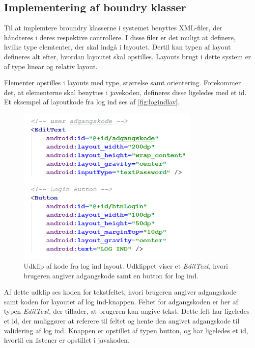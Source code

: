 \subsection{Implementering af boundry klasser}
Til at implemtere broundry klasserne i systemet benyttes XML-filer, der håndteres i deres respektive controllere. I disse filer er det muligt at definere, hvilke type elemtenter, der skal indgå i layoutet. Dertil kan typen af layout defineres alt efter, hvordan layoutet skal opstilles. Layouts brugt i dette system er af type linear og relativ layout.  

Elementer opstilles i layouts med type, størrelse samt orientering. Forekommer det, at elementerne skal benyttes i javekoden, defineres disse ligeledes med et id. Et eksempel af layoutkode fra log ind ses af \autoref{fig:logindlay}.

\begin{figure} [H]
\centering
\includegraphics[width=0.8\textwidth]{figures/imple/logindlay}
\caption{Udklip af kode fra log ind layout. Udklippet viser et \textit{EditText}, hvori brugeren angiver adgangskode samt en button for log ind.}
\label{fig:logindlay}
\end{figure}

Af dette udklip ses koden for tekstfeltet, hvori brugeren angiver adgangskode samt koden for layoutet af log ind-knappen. Feltet for adgangskoden er her af typen \textit{EditText}, der tillader, at brugeren kan angive tekst. Dette felt har ligeledes et id, der muliggører at referere til feltet og hente den angivet adgangskode til validering af log ind. Knappen er opstillet af typen button, og har ligeledes et id, hvortil en listener er opstillet i javakoden. 
